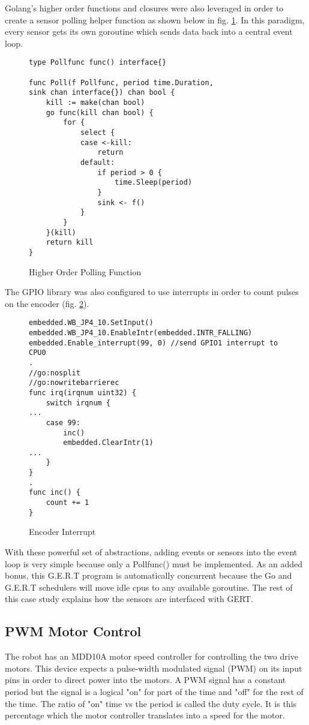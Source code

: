 \clearpage

Golang's higher order functions and closures were also leveraged in order to create a sensor polling helper function
as shown below in fig. \ref{fig:poll_func}. In this paradigm, every sensor gets its own goroutine which sends
data back into a central event loop.

\begin{figure}[h]
\begin{center}
\begin{lstlisting}
type Pollfunc func() interface{}

func Poll(f Pollfunc, period time.Duration,
sink chan interface{}) chan bool {
	kill := make(chan bool)
	go func(kill chan bool) {
		for {
			select {
			case <-kill:
				return
			default:
				if period > 0 {
					time.Sleep(period)
				}
				sink <- f()
			}
		}
	}(kill)
	return kill
}
\end{lstlisting}
\end{center}
  \caption{Higher Order Polling Function} \label{fig:poll_func}
\end{figure}

\clearpage
The GPIO library was also configured to use interrupts in order to count pulses on the encoder (fig. \ref{fig:encoder}).

\begin{figure}[h]
\begin{center}
\begin{lstlisting}
embedded.WB_JP4_10.SetInput()
embedded.WB_JP4_10.EnableIntr(embedded.INTR_FALLING)
embedded.Enable_interrupt(99, 0) //send GPIO1 interrupt to CPU0
.
//go:nosplit
//go:nowritebarrierec
func irq(irqnum uint32) {
	switch irqnum {
...
	case 99:
		inc()
		embedded.ClearIntr(1)
...
	}
}
.
func inc() {
	count += 1
}

\end{lstlisting}
\end{center}
  \caption{Encoder Interrupt} \label{fig:encoder}
\end{figure}


With these powerful set of abstractions, adding events or sensors into the event loop
is very simple because only a Pollfunc() must be implemented. As an added bonus, this
G.E.R.T program is automatically concurrent because the Go and G.E.R.T schedulers will
move idle cpus to any available goroutine. The rest of this case study explains how the sensors
are interfaced with GERT.

\subsection{PWM Motor Control}
The robot has an MDD10A motor speed controller for controlling the two drive motors. This device
expects a pulse-width modulated signal (PWM) on its input pins in order to direct power into the
motors. A PWM signal has a constant period but the signal is a logical "on" for part of the time
and "off" for the rest of the time. The ratio of "on" time vs the period is called the duty cycle.
It is this percentage which the motor controller translates into a speed for the motor.\\

